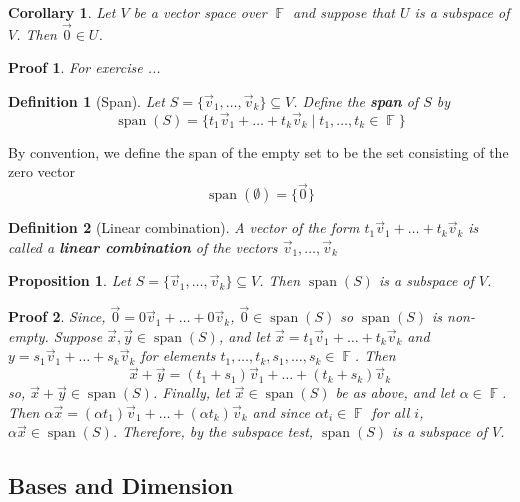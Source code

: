 \documentclass[10pt]{article}
\DeclareMathOperator{\F}{{\mathbb{F}}}
\DeclareMathOperator{\spn}{span}
\theoremstyle{break}
\newtheorem{cor}{Corollary}[thm]
\newtheorem*{pf}{Proof}
\newtheorem{defn}{Definition}[subsection]
\newtheorem{prop}[thm]{Proposition}
\begin{document}
\begin{cor}
    Let $V$ be a vector space over $\F$ and suppose that $U$ is a subspace of $V$. Then $\vec{0} \in U$.
\end{cor}
\begin{pf}
    For exercise ...
\end{pf}
\begin{defn}[Span]
    Let $S = \{\vec{v}_1, \dots, \vec{v}_k\} \subseteq V$. Define the \textbf{span} of $S$ by $$\spn(S) = \{t_1\vec{v}_1 + \dots + t_k\vec{v}_k \mid t_1, \dots, t_k \in \F\}$$
\end{defn}
By convention, we define the span of the empty set to be the set consisting of the zero vector $$\spn(\emptyset) = \{\vec{0}\}$$
\begin{defn}[Linear combination]
    A vector of the form $t_1\vec{v}_1 + \dots + t_k\vec{v}_k$ is called a \textbf{linear combination} of the vectors $\vec{v}_1, \dots, \vec{v}_k$
\end{defn}
\begin{prop}
    Let $S = \{\vec{v}_1, \dots, \vec{v}_k\} \subseteq V$. Then $\spn(S)$ is a subspace of $V$.
\end{prop}
\begin{pf}
    Since, $\vec{0} = 0\vec{v}_1 + \dots + 0\vec{v}_k$, $\vec{0} \in \spn(S)$ so $\spn(S)$ is non-empty. Suppose $\vec{x}, \vec{y} \in \spn(S)$, and let $\vec{x} = t_1\vec{v}_1 + \dots + t_k\vec{v}_k$ and $y = s_1\vec{v}_1 + \dots + s_k\vec{v}_k$
     for elements $t_1, \dots, t_k, s_1, \dots, s_k \in \F$. Then $$\vec{x} + \vec{y} = (t_1 + s_1)\vec{v}_1 + \dots + (t_k + s_k)\vec{v}_k$$
     so, $\vec{x} + \vec{y} \in \spn(S)$. Finally, let $\vec{x} \in \spn(S)$ be as above, and let $\alpha \in \F$. Then $\alpha \vec{x} = (\alpha t_1)\vec{v}_1 + \dots + (\alpha t_k)\vec{v}_k$ and since $\alpha t_i \in \F$ for all $i$, $\alpha \vec{x} \in \spn(S)$. Therefore, by
     the subspace test, $\spn(S)$ is a subspace of $V$.
\end{pf}
\subsection{Bases and Dimension}
\end{document}
